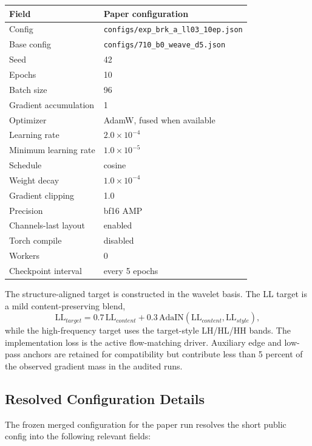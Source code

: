 \documentclass[10pt,twocolumn]{article}
\begin{document}
\begin{center}
\begin{tabular}{ll}
\toprule
Field & Paper configuration \\
\midrule
Config & \texttt{configs/exp\_brk\_a\_ll03\_10ep.json} \\
Base config & \texttt{configs/710\_b0\_weave\_d5.json} \\
Seed & 42 \\
Epochs & 10 \\
Batch size & 96 \\
Gradient accumulation & 1 \\
Optimizer & AdamW, fused when available \\
Learning rate & \(2.0 \times 10^{-4}\) \\
Minimum learning rate & \(1.0 \times 10^{-5}\) \\
Schedule & cosine \\
Weight decay & \(1.0 \times 10^{-4}\) \\
Gradient clipping & 1.0 \\
Precision & bf16 AMP \\
Channels-last layout & enabled \\
Torch compile & disabled \\
Workers & 0 \\
Checkpoint interval & every 5 epochs \\
\bottomrule
\end{tabular}
\end{center}

The structure-aligned target is constructed in the wavelet basis. The LL target is a mild
content-preserving blend,
\[
  \mathrm{LL}_{target} = 0.7\,\mathrm{LL}_{content}
  + 0.3\,\mathrm{AdaIN}(\mathrm{LL}_{content}, \mathrm{LL}_{style}),
\]
while the high-frequency target uses the target-style LH/HL/HH bands. The implementation
loss is the active flow-matching driver. Auxiliary edge and low-pass anchors are retained
for compatibility but contribute less than 5 percent of the observed gradient mass in the
audited runs.

\subsection{Resolved Configuration Details}

The frozen merged configuration for the paper run resolves the short public config
into the following relevant fields:
\end{document}
